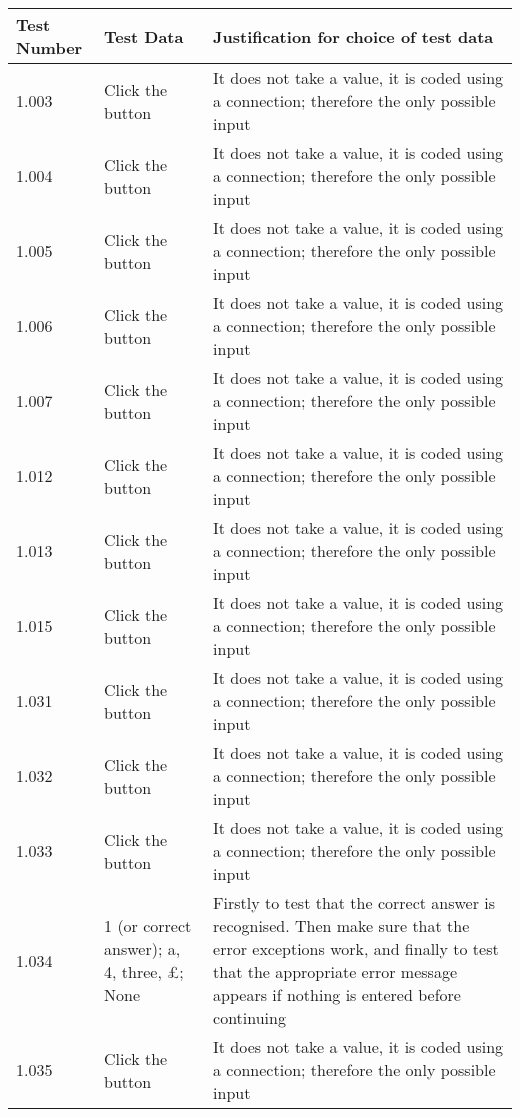 \begin{landscape}
\begin{center}
\begin{longtable}{|p{4cm}|p{4cm}|p{5cm}|}
\textbf{Test Number} & \textbf{Test Data} & \textbf{Justification for choice of test data} \\ \hline
1.003 & Click the button & It does not take a value, it is coded using a connection; therefore the only possible input \\ \hline
1.004 & Click the button & It does not take a value, it is coded using a connection; therefore the only possible input \\ \hline
1.005 & Click the button & It does not take a value, it is coded using a connection; therefore the only possible input \\ \hline
1.006 & Click the button & It does not take a value, it is coded using a connection; therefore the only possible input \\ \hline
1.007 & Click the button & It does not take a value, it is coded using a connection; therefore the only possible input \\ \hline
1.012 & Click the button & It does not take a value, it is coded using a connection; therefore the only possible input \\ \hline
1.013 & Click the button & It does not take a value, it is coded using a connection; therefore the only possible input \\ \hline
1.015 & Click the button & It does not take a value, it is coded using a connection; therefore the only possible input \\ \hline
1.031 & Click the button & It does not take a value, it is coded using a connection; therefore the only possible input \\ \hline
1.032 & Click the button & It does not take a value, it is coded using a connection; therefore the only possible input \\ \hline
1.033 & Click the button & It does not take a value, it is coded using a connection; therefore the only possible input \\ \hline
1.034 & 1 (or correct answer); a, 4, three, £; None & Firstly to test that the correct answer is recognised. Then make sure that the error exceptions work, and finally to test that the appropriate error message appears if nothing is entered before continuing \\ \hline
1.035 & Click the button & It does not take a value, it is coded using a connection; therefore the only possible input \\ \hline

\end{longtable}
\end{center}
\end{landscape}
